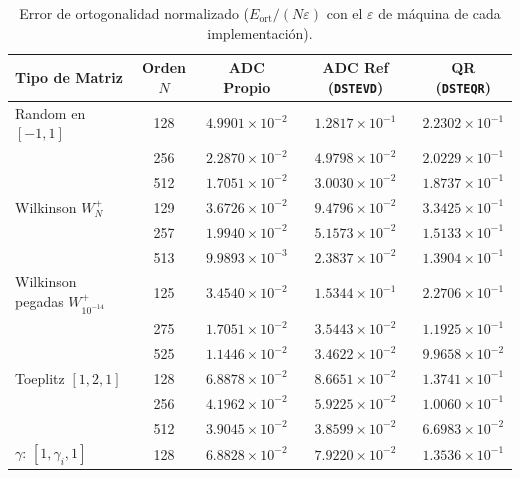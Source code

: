 \documentclass[11pt,a4paper]{article}
\begin{document}
\begin{table}[htbp]
    \centering
    \caption{Error de ortogonalidad normalizado ($E_{\text{ort}} / (N\varepsilon)$ con el $\varepsilon$ de máquina de cada implementación).}
    \label{tab:ortogonalidad}
    \begin{tabular}{@{} l c c c c @{}}
        \toprule
        \textbf{Tipo de Matriz} & \textbf{Orden $N$} & \textbf{ADC Propio} & \textbf{ADC Ref (\texttt{DSTEVD})} & \textbf{QR (\texttt{DSTEQR})} \\
        \midrule
        Random en $[-1, 1]$ & 128 & $4.9901 \times 10^{-2}$ & $1.2817 \times 10^{-1}$ & $2.2302 \times 10^{-1}$ \\
                            & 256 & $2.2870 \times 10^{-2}$ & $4.9798 \times 10^{-2}$ & $2.0229 \times 10^{-1}$ \\
                            & 512 & $1.7051 \times 10^{-2}$ & $3.0030 \times 10^{-2}$ & $1.8737 \times 10^{-1}$ \\
        \midrule
        Wilkinson $W_N^+$   & 129 & $3.6726 \times 10^{-2}$ & $9.4796 \times 10^{-2}$ & $3.3425 \times 10^{-1}$ \\
                            & 257 & $1.9940 \times 10^{-2}$ & $5.1573 \times 10^{-2}$ & $1.5133 \times 10^{-1}$ \\
                            & 513 & $9.9893 \times 10^{-3}$ & $2.3837 \times 10^{-2}$ & $1.3904 \times 10^{-1}$ \\
        \midrule
        Wilkinson pegadas $W_{10^{-14}}^+$ & 125 & $3.4540 \times 10^{-2}$ & $1.5344 \times 10^{-1}$ & $2.2706 \times 10^{-1}$ \\
                            & 275 & $1.7051 \times 10^{-2}$ & $3.5443 \times 10^{-2}$ & $1.1925 \times 10^{-1}$ \\
                            & 525 & $1.1446 \times 10^{-2}$ & $3.4622 \times 10^{-2}$ & $9.9658 \times 10^{-2}$ \\
        \midrule
        Toeplitz $[1, 2, 1]$ & 128 & $6.8878 \times 10^{-2}$ & $8.6651 \times 10^{-2}$ & $1.3741 \times 10^{-1}$ \\
                            & 256 & $4.1962 \times 10^{-2}$ & $5.9225 \times 10^{-2}$ & $1.0060 \times 10^{-1}$ \\
                            & 512 & $3.9045 \times 10^{-2}$ & $3.8599 \times 10^{-2}$ & $6.6983 \times 10^{-2}$ \\
        \midrule
        $\gamma$: $[1, \gamma_i, 1]$ & 128 & $6.8828 \times 10^{-2}$ & $7.9220 \times 10^{-2}$ & $1.3536 \times 10^{-1}$ \\

\end{tabular}
\end{table}
\end{document}

